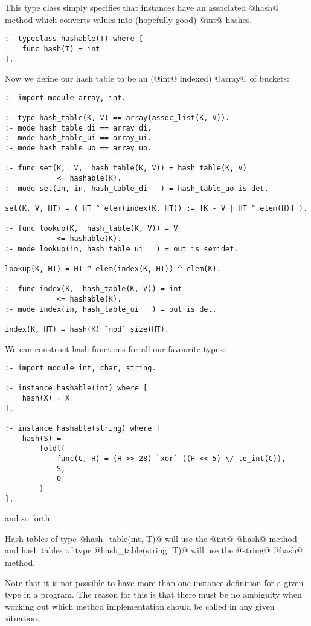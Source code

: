 This type class simply specifies that instances have an associated
@hash@ method which converts values into (hopefully good) @int@ hashes.
\begin{verbatim}
:- typeclass hashable(T) where [
    func hash(T) = int
].
\end{verbatim}
Now we define our hash table to be an (@int@ indexed) @array@ of
buckets:
\begin{verbatim}
:- import_module array, int.

:- type hash_table(K, V) == array(assoc_list(K, V)).
:- mode hash_table_di == array_di.
:- mode hash_table_ui == array_ui.
:- mode hash_table_uo == array_uo.

:- func set(K,  V,  hash_table(K, V)) = hash_table(K, V)
            <= hashable(K).
:- mode set(in, in, hash_table_di   ) = hash_table_uo is det.

set(K, V, HT) = ( HT ^ elem(index(K, HT)) := [K - V | HT ^ elem(H)] ).

:- func lookup(K,  hash_table(K, V)) = V
            <= hashable(K).
:- mode lookup(in, hash_table_ui   ) = out is semidet.

lookup(K, HT) = HT ^ elem(index(K, HT)) ^ elem(K).

:- func index(K,  hash_table(K, V)) = int
            <= hashable(K).
:- mode index(in, hash_table_ui   ) = out is det.

index(K, HT) = hash(K) `mod` size(HT).
\end{verbatim}

We can construct hash functions for all our favourite types:
\begin{verbatim}
:- import_module int, char, string.

:- instance hashable(int) where [
    hash(X) = X
].

:- instance hashable(string) where [
    hash(S) =
        foldl(
            func(C, H) = (H >> 28) `xor` ((H << 5) \/ to_int(C)),
            S,
            0
        )
].
\end{verbatim}
and so forth.

Hash tables of type @hash_table(int, T)@ will use the @int@ @hash@
method and hash tables of type @hash_table(string, T)@ will use the
@string@ @hash@ method.

Note that it is not possible to have more than one instance definition
for a given type in a program.  The reason for this is that there must
be no ambiguity when working out which method implementation should be
called in any given situation.

